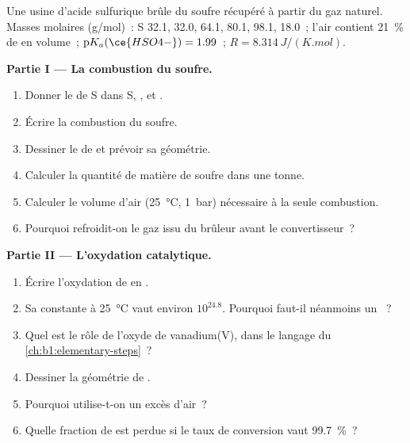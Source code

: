 \begin{problem}
\label{pb:b1:p-block-16-18:1}
Une usine d'acide sulfurique brûle du soufre récupéré à partir du gaz
naturel. Masses molaires
(\unit{g/mol})~: S 32.1,  32.0,  64.1,  80.1,
 98.1,  18.0~; l'air contient \qty{21}{\percent} de
 en volume~; $\mathrm{p}K_a(\ce{HSO4-}) = 1.99$~; $R =
\qty{8.314}{J/(K.mol)}$.

\medskip
\noindent\textbf{Partie I --- La combustion du soufre.}
\begin{enumerate}
  \item Donner le  de S dans S, ,  et
        .
  \item Écrire la combustion du soufre.
  \item Dessiner le  de  et prévoir sa géométrie.
  \item Calculer la quantité de matière de soufre dans une tonne.
  \item Calculer le volume d'air (\qty{25}{\celsius}, \qty{1}{bar})
        nécessaire à la seule combustion.
  \item Pourquoi refroidit-on le gaz issu du brûleur avant le
        convertisseur~?
\end{enumerate}

\medskip
\noindent\textbf{Partie II --- L'oxydation catalytique.}
\begin{enumerate}[resume]
  \item Écrire l'oxydation de  en .
  \item Sa constante à \qty{25}{\celsius} vaut environ $10^{24.8}$.
        Pourquoi faut-il néanmoins un ~?
  \item Quel est le rôle de l'oxyde de vanadium(V), dans le langage du
        \cref{ch:b1:elementary-steps}~?
  \item Dessiner la géométrie de .
  \item Pourquoi utilise-t-on un excès d'air~?
  \item Quelle fraction de  est perdue si le taux de conversion
        vaut \qty{99.7}{\percent}~?
\end{enumerate}


\end{problem}
